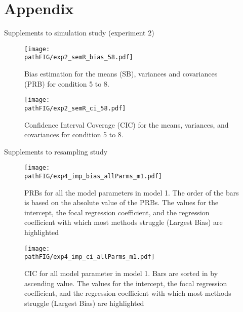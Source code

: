 \section{Appendix}

\FloatBarrier

Supplements to simulation study (experiment 2)

\begin{figure}
	\centering
	\texttt{[image: \\pathFIG/exp2\_semR\_bias\_58.pdf]}
	\caption{Bias estimation for the means (SB), variances and covariances (PRB) for condition 5 
			to 8.}
	\label{fig:exp2bias58}
\end{figure}

\begin{figure}
	\centering
	\texttt{[image: \\pathFIG/exp2\_semR\_ci\_58.pdf]}
	\caption{Confidence Interval Coverage (CIC) for the means, variances, and covariances 
			for condition 5 to 8.}
	\label{fig:exp2cir58}
\end{figure}

Supplements to resampling study

\begin{figure}
	\centering
	\texttt{[image: \\pathFIG/exp4\_imp\_bias\_allParms\_m1.pdf]}
	\caption{PRBs for all the model parameters in model 1. 
		The order of the bars is based on the absolute value of the PRBs.
		The values for the intercept, the focal regression coefficient, and the regression coefficient with which most 
		methods struggle (Largest Bias) are highlighted}
	\label{fig:exp4bias_m1}
\end{figure}

\begin{figure}
	\centering
	\texttt{[image: \\pathFIG/exp4\_imp\_ci\_allParms\_m1.pdf]}
	\caption{CIC for all model parameter in model 1.
		Bars are sorted in by ascending value.
		The values for the intercept, the focal regression coefficient, and the regression coefficient with which most 
		methods struggle (Largest Bias) are highlighted}
	\label{fig:exp4cir_m1}
\end{figure}

\FloatBarrier
